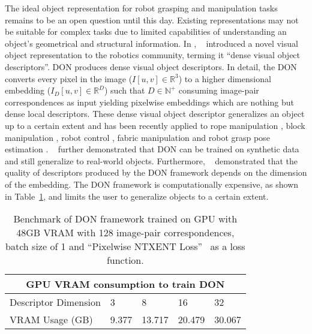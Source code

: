 The ideal object representation for robot grasping and manipulation tasks remains to be an open question until this day.
Existing representations may not be suitable for complex tasks due to limited capabilities of understanding an object's geometrical and structural information.
In \citeyear{florence2018dense}, \citeauthor{florence2018dense}~\cite{florence2018dense} introduced a novel visual
object representation to the robotics community,  terming it ``dense visual object descriptors''. 
DON produces dense visual object descriptors. 
In detail, the DON converts every pixel in the image ($I[u, v] \in \mathbb{R}^3$) to a higher dimensional embedding ($I_D[u, v] \in \mathbb{R}^D$) such that $D \in \mathbb{N}^+$ consuming image-pair correspondences as input yielding pixelwise embeddings which are nothing but dense local descriptors.
These dense visual object descriptor generalizes an object up to a certain extent and has been recently applied to rope manipulation \cite{rope-manipulation}, block manipulation \cite{block-manipulation}, robot control \cite{florence2019self}, fabric manipulation \cite{fabric-manipulation} and robot grasp pose estimation \parencites{kupcsik2021supervised}{adrian2022efficient}. \citeauthor{adrian2022efficient}~\cite{adrian2022efficient} further demonstrated that DON can be trained on synthetic data and still generalize to real-world objects. Furthermore, \citeauthor{adrian2022efficient}~\cite{adrian2022efficient} demonstrated that the quality of descriptors produced by the DON framework depends on the dimension of the embedding. 
The DON framework is computationally expensive, as shown in Table~\ref{table:don_gpu_bechmark}, and limits the user to generalize objects to a certain extent.

\begin{table}[htb]
    \caption{Benchmark of DON framework trained on GPU with 48GB VRAM with 128 image-pair correspondences, batch size of 1 and ``Pixelwise NTXENT Loss''~\cite{adrian2022efficient} as a loss function.}
    \label{table:don_gpu_bechmark}
    \centering
    \begin{tabular}{lllll}
        \toprule
        \multicolumn{5}{c}{GPU VRAM consumption to train DON}   \\
        \midrule
        Descriptor Dimension & 3     & 8      & 16     & 32     \\
        VRAM Usage (GB)      & 9.377 & 13.717 & 20.479 & 30.067 \\
        \bottomrule
    \end{tabular}
\end{table}

